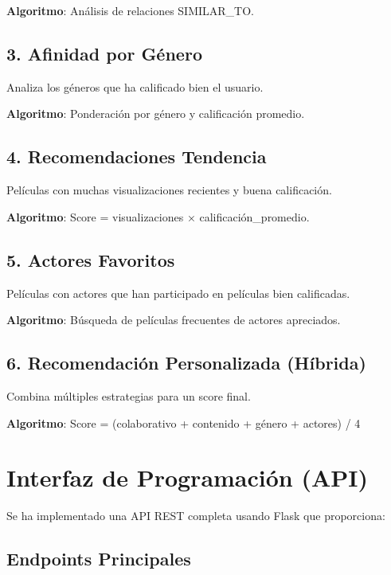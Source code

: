 \documentclass[12pt]{article}
\begin{document}
\textbf{Algoritmo}: Análisis de relaciones SIMILAR\_TO.

\subsection{3. Afinidad por Género}

Analiza los géneros que ha calificado bien el usuario.

\textbf{Algoritmo}: Ponderación por género y calificación promedio.

\subsection{4. Recomendaciones Tendencia}

Películas con muchas visualizaciones recientes y buena calificación.

\textbf{Algoritmo}: Score = visualizaciones × calificación\_promedio.

\subsection{5. Actores Favoritos}

Películas con actores que han participado en películas bien calificadas.

\textbf{Algoritmo}: Búsqueda de películas frecuentes de actores apreciados.

\subsection{6. Recomendación Personalizada (Híbrida)}

Combina múltiples estrategias para un score final.

\textbf{Algoritmo}: Score = (colaborativo + contenido + género + actores) / 4

\newpage
\section{Interfaz de Programación (API)}

Se ha implementado una API REST completa usando Flask que proporciona:

\subsection{Endpoints Principales}
\end{document}
